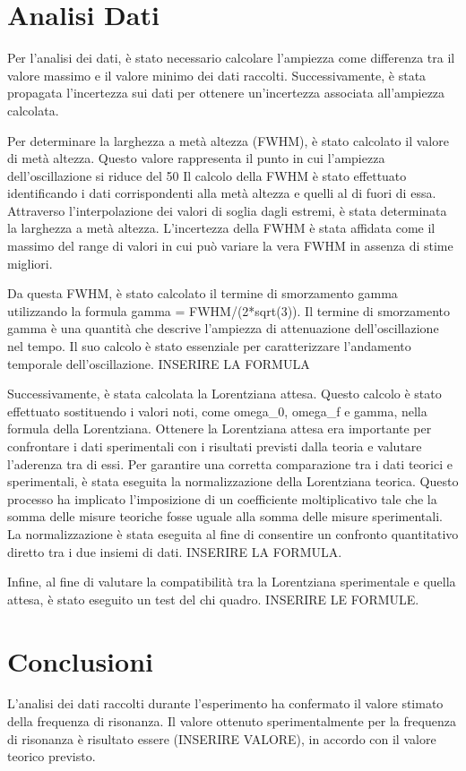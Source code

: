 \documentclass[12pt]{article}
\begin{document}
\section{Analisi Dati}
Per l'analisi dei dati, è stato necessario calcolare l'ampiezza come differenza tra il 
valore massimo e il valore minimo dei dati raccolti.
Successivamente, è stata propagata l'incertezza sui dati per ottenere un'incertezza 
associata all'ampiezza calcolata.

Per determinare la larghezza a metà altezza (FWHM), è stato calcolato il valore di metà altezza. 
Questo valore rappresenta il punto in cui l'ampiezza dell'oscillazione si riduce del 
50%
Il calcolo della FWHM è stato effettuato identificando i dati corrispondenti alla metà 
altezza e quelli al di fuori di essa. Attraverso l'interpolazione dei valori di soglia 
dagli estremi, è stata determinata la larghezza a metà altezza. L'incertezza della FWHM è 
stata affidata come il massimo del range di valori in cui può variare la vera FWHM in 
assenza di stime migliori.

Da questa FWHM, è stato calcolato il termine di smorzamento gamma utilizzando la formula 
gamma = FWHM/(2*sqrt(3)).
Il termine di smorzamento gamma è una quantità che descrive l'ampiezza di attenuazione 
dell'oscillazione nel tempo. Il suo calcolo è stato essenziale per caratterizzare l'andamento 
temporale dell'oscillazione.
INSERIRE LA FORMULA

Successivamente, è stata calcolata la Lorentziana attesa. 
Questo calcolo è stato effettuato sostituendo i valori noti, come omega_0, omega_f e gamma, 
nella formula della Lorentziana. Ottenere la Lorentziana attesa era importante per confrontare 
i dati sperimentali con i risultati previsti dalla teoria e valutare l'aderenza tra di essi.
Per garantire una corretta comparazione tra i dati teorici e sperimentali, è stata eseguita 
la normalizzazione della Lorentziana teorica. Questo processo ha implicato l'imposizione 
di un coefficiente moltiplicativo tale che la somma delle misure teoriche fosse uguale 
alla somma delle misure sperimentali. La normalizzazione è stata eseguita al fine di 
consentire un confronto quantitativo diretto tra i due insiemi di dati.
INSERIRE LA FORMULA.

Infine, al fine di valutare la compatibilità tra la Lorentziana sperimentale e 
quella attesa, è stato eseguito un test del chi quadro. 
INSERIRE LE FORMULE.

\section{Conclusioni}
L'analisi dei dati raccolti durante l'esperimento ha confermato il valore stimato della 
frequenza di risonanza. Il valore ottenuto sperimentalmente per la frequenza di risonanza 
è risultato essere (INSERIRE VALORE), in accordo con il valore teorico previsto.
\end{document}
